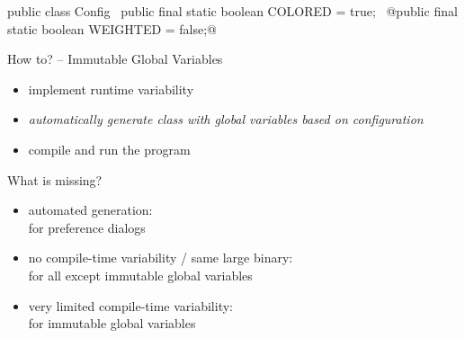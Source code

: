 \begin{frame}[fragile,label=SPLwithImmutableGlobalVariables]{\myframetitle}
	\begin{mycolumns}[widths={48}]
\begin{codetight}[basicstyle=\small]{}
public class Config {
	~public final static boolean COLORED = true;~
	@public final static boolean WEIGHTED = false;@
}
\end{codetight}
		\begin{definition}{How to? -- Immutable Global Variables}
			\begin{itemize}
				\item implement runtime variability
				\item \emph{automatically generate class with global variables based on configuration}
				\item compile and run the program
			\end{itemize}
		\end{definition}
	\mynextcolumn
		\begin{note}{What is missing?}
			\begin{itemize}
				\item automated generation:\\\hfill for preference dialogs
				\item no compile-time variability / same large binary:\\\hfill for all except immutable global variables
				\item very limited compile-time variability:\\\hfill for immutable global variables
			\end{itemize}
		\end{note}
	\end{mycolumns}
\end{frame}


